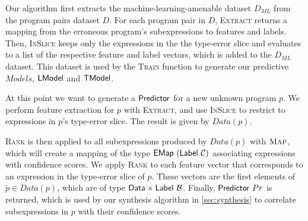 

Our algorithm first extracts the machine-learning-amenable dataset $D_{ML}$
from the program pairs dataset $D$. For each program pair in $D$,
\textsc{Extract} returns a mapping from the erroneous program's subexpressions
to features and labels. Then, \textsc{InSlice} keeps only the expressions in
the the type-error slice and evaluates to a list of the respective feature and
label vectors, which is added to the $D_{ML}$ dataset. This dataset
is used by the \textsc{Train} function to generate our predictive $Models$, \ie
$\mathsf{LModel}$ and $\mathsf{TModel}$.

At this point we want to generate a $\mathsf{Predictor}$ for a new unknown program
$p$. We perform feature extraction for $p$ with \textsc{Extract}, and use
\textsc{InSlice} to restrict to expressions in $p$'s type-error slice.
The result is given by $Data(p)$.

\textsc{Rank} is then applied to all subexpressions produced by $Data(p)$ with
$\textsc{Map}$, which will create a mapping of the type
$\mathsf{EMap}\ (\mathsf{Label}\ \mathcal{C})$ associating expressions with confidence scores. We
apply \textsc{Rank} to each feature vector that corresponds to an expression in
the type-error slice of $p$. These vectors are the first elements of $\tilde{p}
\in Data(p)$, which are of type $\mathsf{Data} \times \mathsf{Label}\ \mathcal{B}$. Finally,
$\mathsf{Predictor}\ Pr$ is returned, which is used by our synthesis algorithm in
\autoref{sec:synthesis} to correlate subexpressions in $p$ with their confidence
scores.
